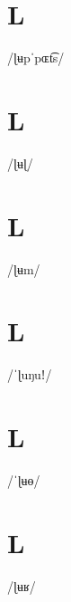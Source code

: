 \documentclass[10pt,a4paper,twoside]{book}
\begin{document}
\section*{L}

\begin{multicols}{3}
 {/ɭʉpˈpɶt͡s/} {}
\end{multicols}

\section*{L}

\begin{multicols}{3}
 {/ɭʉɭ/} {}
\end{multicols}

\section*{L}

\begin{multicols}{3}
 {/ɭʉm/} {}
\end{multicols}

\section*{L}

\begin{multicols}{3}
 {/ˈɭuŋuǃ/} {}
\end{multicols}

\section*{L}

\begin{multicols}{3}
 {/ˈɭʉɵ/} {}
\end{multicols}

\section*{L}

\begin{multicols}{3}
 {/ɭʉʁ/} {}
\end{multicols}
\end{document}
